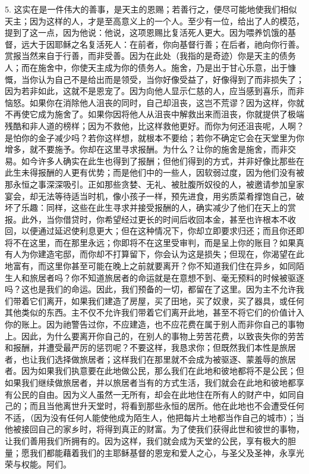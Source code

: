 5. 这实在是一件伟大的善事，是天主的恩赐；若善行之，便尽可能地使我们相似天主；因为这样的人，才是至高意义上的一个人。至少有一位，给出了人的模范，提到了这一点，因为他说：他说，这项恩赐比复活死人更大。因为喂养饥饿的基督，远大于因耶稣之名复活死人：在前者，你向基督行善；在后者，祂向你行善。赏报当然来自于行善，而非受善。因为在此处（我指的是奇迹）你是天主的债务人；而在施舍中，你使天主成为你的债务人。施舍，乃是出于甘心乐意，出于慷慨，当你认为自己不是给出而是领受，当你好像受益了，好像得到了而非损失了；因为若非如此，这就不是恩宠了。因为向他人显示仁慈的人，应当感到喜乐，而非恼怒。如果你在消除他人沮丧的同时，自己却沮丧，这岂不荒谬？因为这样，你就不再使它成为施舍了。如果你因将他人从沮丧中解救出来而沮丧，你就提供了极端残酷和非人道的榜样；因为不救他，比这样救他更好。而你为何还沮丧呢，人啊？是怕你的金子减少吗？若你这样想，就根本不要给；若你不确定它会在天堂里为你增多，就不要施予。你却在这里寻求报酬。为什么？让你的施舍是施舍，而非交易。如今许多人确实在此生也得到了报酬；但他们得到的方式，并非好像比那些在此生未得报酬的人更有优势；而是他们中的一些人，因软弱过度，因为他们没有被那永恒之事深深吸引。正如那些贪婪、无礼、被肚腹所奴役的人，被邀请参加皇家宴会，却无法等待适当时机，像小孩子一样，预先进食，用劣质菜肴撑饱自己，破坏了乐趣：同样，这些在此生寻求并接受报酬的人，确实减少了他们在天上的赏报。此外，当你借贷时，你希望经过更长的时间后收回本金，甚至也许根本不收回，以便通过延迟使利息更大；但在这种情况下，你却立即要求归还；而且你还即将不在这里，而在那里永远；你即将不在这里受审判，而是呈上你的账目？如果真有人为你建造宅邸，而你却不打算留下，你会认为这是损失；但现在，你渴望在此地富有，而这里你甚至可能在晚上之前就要离开？你不知道我们住在异乡，如同陌生人和旅居者吗？你不知道旅居者的命运就是在意想不到、毫无预料的时候被驱逐吗？这也是我们的命运。因此，我们预备的一切，都留在了这里。因为主不允许我们带着它们离开，如果我们建造了房屋，买了田地，买了奴隶，买了器具，或任何其他类似的东西。主不仅不允许我们带着它们离开此地，甚至不将它们的价值计入你的账上。因为祂警告过你，不应建造，也不应花费在属于别人而非你自己的事物上。因此，为什么要离开你自己的，在别人的事物上劳苦花费，以致丧失你的劳苦和报酬，并遭受最严厉的惩罚呢？不要这样，我恳求你；但既然我们本性是旅居者，也让我们选择做旅居者；这样我们在那里就不会成为被驱逐、蒙羞辱的旅居者。因为如果我们执意要在此地做公民，那么我们在此地和彼地都将不是公民；但如果我们继续做旅居者，并以旅居者当有的方式生活，我们就会在此地和彼地都享有公民的自由。因为义人虽然一无所有，却会在此地住在所有人的财产中，如同自己的；而且当他离世升天堂时，将看到那些永恒的居所。他在此地也不会遭受任何不适，（因为没有任何人能使他成为陌生人，他把每片土地都当作自己的城市）；当他被接回自己的家乡时，将得到真正的财富。为了使我们获得此世和彼世的事物，让我们善用我们所拥有的。因为这样，我们就会成为天堂的公民，享有极大的胆量；愿我们都能藉着我们的主耶稣基督的恩宠和爱人之心，与圣父及圣神，永享光荣与权能。阿们。\par

